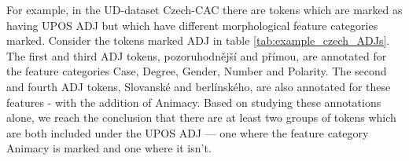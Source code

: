 \documentclass[USenglish]{article}
\begin{document}
For example, in the UD-dataset Czech-CAC there are tokens which are marked as having UPOS ADJ but which have different morphological feature categories marked. 
Consider the tokens marked ADJ in table \ref{tab:example_czech_ADJs}.
The first and third ADJ tokens, pozoruhodnější and přímou, are annotated for the feature categories Case, Degree, Gender, Number and Polarity. 
The second and fourth ADJ tokens, Slovanské and berlínského, are also annotated for these features - with the addition of Animacy. 
Based on studying these annotations alone, we reach the conclusion that there are at least two groups of tokens which are both included under the UPOS ADJ --- one where the feature category Animacy is marked and one where it isn't.
\end{document}
